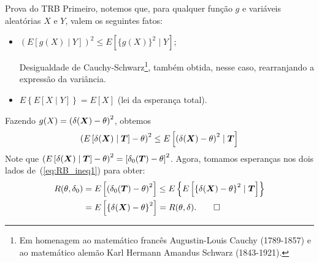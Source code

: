 \begin{frame}{Prova do TRB}
 Primeiro, notemos que, para qualquer função $g$ e variáveis aleatórias $X$ e $Y$, valem os seguintes fatos:
 \begin{itemize}
  \item $\left(E[g(X) \mid Y] \right)^2 \leq E\left[\{g(X)\}^2 \mid Y\right]$;
  
  Desigualdade de Cauchy-Schwarz\footnote{Em homenagem ao matemático francês Augustin-Louis Cauchy (1789-1857) e ao matemático alemão Karl Hermann Amandus Schwarz (1843-1921).}, também obtida, nesse caso, rearranjando a expressão da variância.
  
  \item $E\left\{E[X\mid Y]\right\} = E[X]$ (lei da esperança total).
 \end{itemize}

 Fazendo $g(X) = \left( \delta(\boldsymbol{X})-\theta\right)^2$, obtemos
 \begin{equation}
 \label{eq:RB_ineq1}
  \left(E\left[\delta(\boldsymbol{X}) \mid \boldsymbol{T} \right] -\theta \right)^2 \leq E\left[\left( \delta(\boldsymbol{X}) - \theta \right)^2 \mid \boldsymbol{T} \right]
 \end{equation}
Note que $\left(E\left[\delta(\boldsymbol{X}) \mid \boldsymbol{T} \right] -\theta \right)^2 = \left[\delta_0(\boldsymbol{T}) -\theta \right]^2$.
Agora, tomamos esperanças nos dois lados de~(\ref{eq:RB_ineq1}) para obter:
\begin{align*}
  R(\theta, \delta_0) &= E\left[ \left(\delta_0(\boldsymbol{T}) -\theta \right)^2 \right] \leq E\left\{E\left[\left\{ \delta(\boldsymbol{X}) - \theta \right\}^2 \mid \boldsymbol{T} \right]\right\} \\
  &= E\left[ \left\{\delta(\boldsymbol{X}) -\theta \right\}^2 \right] = R(\theta, \delta). \qed
\end{align*}
\end{frame}

